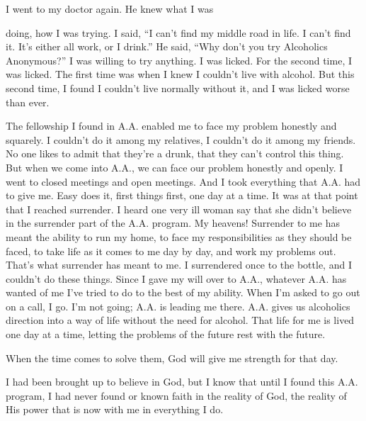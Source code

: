 I went to my doctor again. He knew what I was

doing, how I was trying. I said, “I can’t find my middle road in life. I can’t find it. It’s either all work, or I drink.” He said, “Why don’t you try Alcoholics Anonymous?” I was willing to try anything. I was licked. For the second time, I was licked. The first time was when I knew I couldn’t live with alcohol. But this second time, I found I couldn’t live normally without it, and I was licked worse than ever.

The fellowship I found in A.A. enabled me to face my problem honestly and squarely. I couldn’t do it among my relatives, I couldn’t do it among my friends. No one likes to admit that they’re a drunk, that they can’t control this thing. But when we come into A.A., we can face our problem honestly and openly. I went to closed meetings and open meetings. And I took everything that A.A. had to give me. Easy does it, first things first, one day at a time. It was at that point that I reached surrender. I heard one very ill woman say that she didn’t believe in the surrender part of the A.A. program. My heavens! Surrender to me has meant the ability to run my home, to face my responsibilities as they should be faced, to take life as it comes to me day by day, and work my problems out. That’s what surrender has meant to me. I surrendered once to the bottle, and I couldn’t do these things. Since I gave my will over to A.A., whatever A.A. has wanted of me I’ve tried to do to the best of my ability. When I’m asked to go out on a call, I go. I’m not going; A.A. is leading me there. A.A. gives us alcoholics direction into a way of life without the need for alcohol. That life for me is lived one day at a time, letting the problems of the future rest with the future.

When the time comes to solve them, God will give me strength for that day.

I had been brought up to believe in God, but I know that until I found this A.A. program, I had never found or known faith in the reality of God, the reality of His power that is now with me in everything I do.
